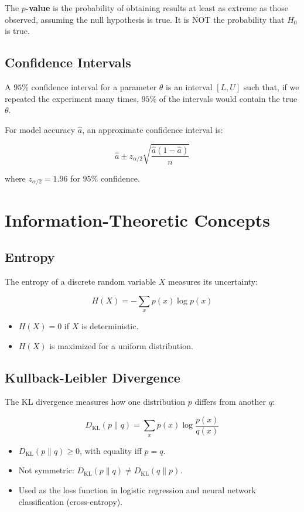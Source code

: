 \begin{definition}[$p$-value]
	The \textbf{$p$-value} is the probability of obtaining results at least as extreme as those observed, assuming the null hypothesis is true. It is NOT the probability that $H_0$ is true.
\end{definition}

\subsection{Confidence Intervals}

A $95\%$ confidence interval for a parameter $\theta$ is an interval $[L, U]$ such that, if we repeated the experiment many times, $95\%$ of the intervals would contain the true $\theta$.

For model accuracy $\hat{a}$, an approximate confidence interval is:

\[
	\hat{a} \pm z_{\alpha/2} \sqrt{\frac{\hat{a}(1 - \hat{a})}{n}}
\]

where $z_{\alpha/2} = 1.96$ for $95\%$ confidence.

\section{Information-Theoretic Concepts}

\subsection{Entropy}

The entropy of a discrete random variable $X$ measures its uncertainty:

\[
	H(X) = -\sum_{x} p(x) \log p(x)
\]

\begin{itemize}
	\item $H(X) = 0$ if $X$ is deterministic.
	\item $H(X)$ is maximized for a uniform distribution.
\end{itemize}

\subsection{Kullback-Leibler Divergence}

The KL divergence measures how one distribution $p$ differs from another $q$:

\[
	D_{\text{KL}}(p \parallel q) = \sum_{x} p(x) \log \frac{p(x)}{q(x)}
\]

\begin{itemize}
	\item $D_{\text{KL}}(p \parallel q) \geq 0$, with equality iff $p = q$.
	\item Not symmetric: $D_{\text{KL}}(p \parallel q) \neq D_{\text{KL}}(q \parallel p)$.
	\item Used as the loss function in logistic regression and neural network classification (cross-entropy).
\end{itemize}

